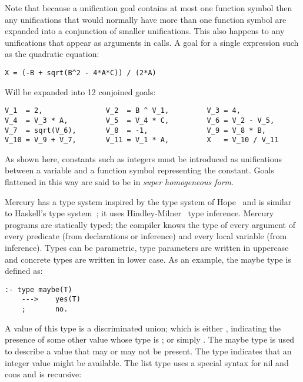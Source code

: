 \label{superhomogeneous}
Note that because a unification goal contains at most one function symbol
then any unifications that would normally have more than one function symbol
are expanded into a conjunction of smaller unifications.
This also happens to any unifications that appear as arguments in calls.
A goal for a single expression such as the quadratic equation:

\begin{verbatim}
X = (-B + sqrt(B^2 - 4*A*C)) / (2*A)
\end{verbatim}

\noindent
Will be expanded into 12 conjoined goals:

\begin{verbatim}
V_1  = 2,               V_2  = B ^ V_1,         V_3 = 4,
V_4  = V_3 * A,         V_5  = V_4 * C,         V_6 = V_2 - V_5,
V_7  = sqrt(V_6),       V_8  = -1,              V_9 = V_8 * B,
V_10 = V_9 + V_7,       V_11 = V_1 * A,         X   = V_10 / V_11
\end{verbatim}

\noindent
As shown here,
constants such as integers must be introduced as unifications between a
variable and a function symbol representing the constant.
Goals flattened in this way are said to be in
\emph{super homogeneous form}.

Mercury has a type system inspired by the type system of Hope~\citep{hope}
and is similar to Haskell's type system~\citep{haskell98};
it uses Hindley-Milner~\citep{hindley69:types,milner78:types} type
inference.
Mercury programs are statically typed; the compiler knows the type of every
argument of every predicate (from declarations or inference) and every local
variable (from inference).
Types can be parametric,
type parameters are written in uppercase and
concrete types are written in lower case.
As an example, the maybe type is defined as:

\begin{verbatim}
:- type maybe(T)
    --->    yes(T)
    ;       no.
\end{verbatim}

\noindent
A value of this type is a discriminated union;
which is either , indicating the presence of some other value
whose type is ;
or simply .
The maybe type is used to describe a value that may or may not be present.
The type  indicates that an integer value might be
available.
The list type uses a special syntax for nil and cons and is recursive:

